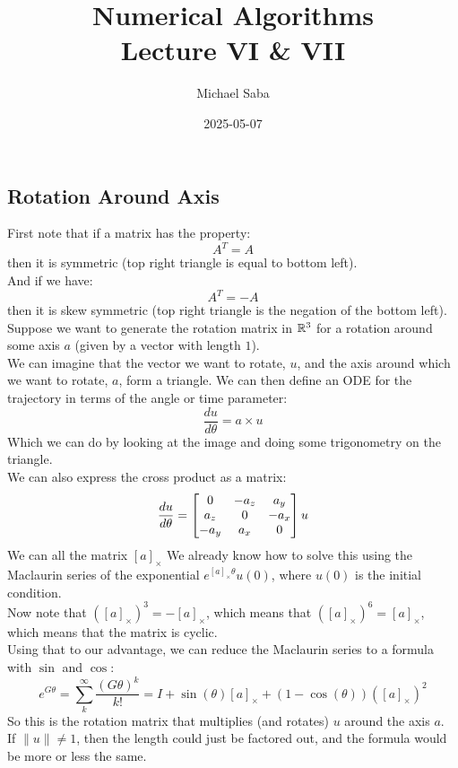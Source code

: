 \documentclass[12pt]{article}
\title{%
    \Huge Numerical Algorithms \\
    \Large Lecture VI \& VII
}
\date{2025-05-07}
\author{Michael Saba}
\begin{document}
\maketitle
\newpage
\setlength{\parindent}{0pt}

\subsection*{Rotation Around Axis}

First note that if a matrix has the property:
\[ A^T = A \]
then it is symmetric (top right triangle
is equal to bottom left). \\
And if we have:
\[ A^T = -A \]
then it is skew symmetric (top right triangle
is the negation of the bottom left). \\

Suppose we want to generate the rotation
matrix in $\mathbb{R}^3$ for a rotation around some
axis $a$ (given by a vector with length $1$). \\

We can imagine that the vector we want to rotate,
$u$, and the axis around which we want
to rotate, $a$,
form a triangle.
We can then define an ODE for the trajectory
in terms of the angle or time parameter:
\[ \dfrac{du}{d\theta} = a \times u \]
Which we can do by looking at the image
and doing some trigonometry on the triangle. \\
We can also express the cross product as a matrix:
\[ \dfrac{du}{d\theta} = 
\begin{bmatrix} 0 & -a_z & a_y \\ a_z & 0 & -a_x \\ -a_y & a_x & 0 \end{bmatrix}
u \]
We can all the matrix $[a]_\times$
We already know how to solve this using the
Maclaurin series of the exponential 
$e^{[a]_\times\theta}u(0)$,
where $u(0)$ is the initial condition. \\

Now note that $([a]_\times)^3 = -[a]_\times$,
which means that $([a]_\times)^6 = [a]_\times$,
which means that the matrix is cyclic. \\
Using that to our advantage,
we can reduce the Maclaurin series to
a formula with $\sin$ and $\cos$:
\[ e^{G\theta} = \sum_k^{\infty} 
\dfrac{(G\theta)^k}{k!}
= I + \sin(\theta)[a]_\times 
+ (1-\cos(\theta))([a]_\times)^2 \]
So this is the rotation matrix
that multiplies (and rotates) $u$
around the axis $a$. \\

If $\|u\| \neq 1$, then the length
could just be factored out,
and the formula would be more or less
the same. \\ 
\end{document}
